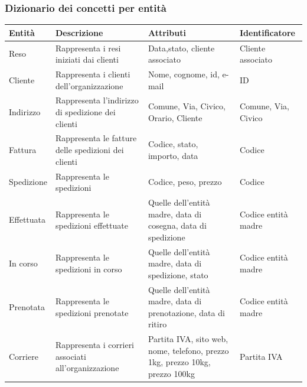 \subsubsection{Dizionario dei concetti per entità}
\begin{table}[H]
	\centering
	\begin{tabularx}{\dimexpr{}\arrayrulewidth}{|*{4}{Y|}} %
		\hline
		\textbf{Entità} & \textbf{Descrizione} & \textbf{Attributi} & \textbf{Identificatore} \\ \hline
		 Reso & Rappresenta i resi iniziati dai clienti & Data,stato, cliente associato & Cliente associato \\
		 \hline
		 Cliente & Rappresenta i clienti dell'organizzazione & Nome, cognome, id, e-mail & ID \\
		\hline 
		Indirizzo & Rappresenta l'indirizzo di spedizione dei clienti & Comune, Via, Civico, Orario, Cliente & Comune, Via, Civico \\ 
		\hline
		Fattura & Rappresenta le fatture delle spedizioni dei clienti & Codice, stato, importo, data & Codice\\
		\hline
		Spedizione & Rappresenta le spedizioni & Codice, peso, prezzo & Codice \\ 
		\hline
		Effettuata & Rappresenta le spedizioni effettuate & Quelle dell'entità madre, data di cosegna, data di spedizione & Codice entità madre \\
		\hline
		In corso & Rappresenta le spedizioni in corso & Quelle dell'entità madre, data di spedizione, stato & Codice entità madre \\
		\hline
		Prenotata & Rappresenta le spedizioni prenotate & Quelle dell'entità madre, data di prenotazione, data di ritiro & Codice entità madre \\
		\hline
		Corriere & Rappresenta i corrieri associati all'organizzazione & Partita IVA, sito web, nome, telefono, prezzo 1kg, prezzo 10kg, prezzo 100kg & Partita IVA \\
		\hline 
	\end{tabularx}
\end{table}

